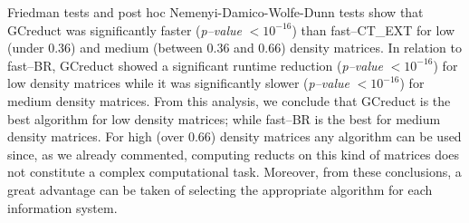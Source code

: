 \documentclass[authoryear,preprint,review,12pt]{elsarticle}
\begin{document}
	Friedman tests and post hoc Nemenyi-Damico-Wolfe-Dunn tests show that GCreduct was significantly faster (\textit{p--value} $< 10^{-16}$) than fast--CT\_EXT for low (under 0.36) and medium (between 0.36 and 0.66) density matrices. 
	In relation to fast--BR, GCreduct showed a significant runtime reduction (\textit{p--value} $< 10^{-16}$) for low density matrices while it was significantly slower (\textit{p--value} $< 10^{-16}$) for medium density matrices. 
	From this analysis, we conclude that GCreduct is the best algorithm for low density matrices; while fast--BR is the best for medium density matrices. For high (over 0.66) density matrices any algorithm can be used since, as we already commented, computing reducts on this kind of matrices does not constitute a complex computational task. Moreover, from these conclusions, a great advantage can be taken of selecting the appropriate algorithm for each information system. 
		
\end{document}
